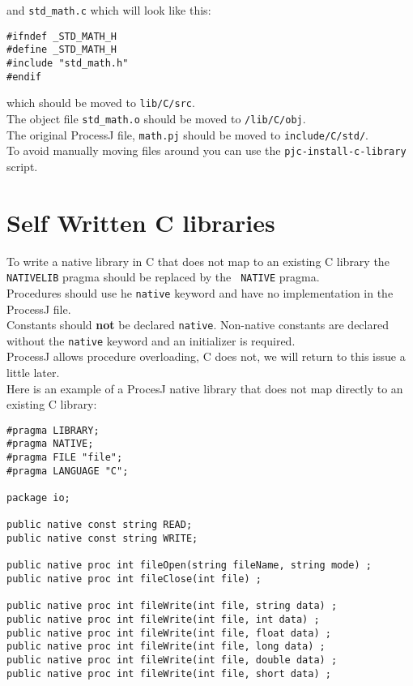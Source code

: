 \documentclass[pdflatex,11pt,letter]{article}
\begin{document}
\noindent
and {\tt std\_math.c} which will look like this:

\begin{verbatim}
#ifndef _STD_MATH_H
#define _STD_MATH_H
#include "std_math.h"
#endif
\end{verbatim}

\noindent
which should be moved to {\tt lib/C/src}.\\

\noindent
The object file {\tt std\_math.o} should be moved to {\tt /lib/C/obj}.\\

\noindent
The original ProcessJ file, {\tt math.pj} should be moved to {\tt include/C/std/}.\\

\noindent
To avoid manually moving files around you can use the {\tt pjc-install-c-library} script.

\section{Self Written C libraries}

To write a native library in C that does not map to an existing C
library the {\tt NATIVELIB} pragma should be replaced by the {\tt
  NATIVE} pragma.\\

\noindent
Procedures should use he {\tt native} keyword and have no
implementation in the ProcessJ file.\\

\noindent
Constants should {\bf not} be declared {\tt native}.
Non-native constants are declared without the
{\tt native} keyword and an initializer is required.\\

\noindent
ProcessJ allows procedure overloading, C does not, we will return to
this issue a little later.\\

\noindent
Here is an example of a ProcesJ native library that does not map
directly to an existing C library:

\begin{verbatim}
#pragma LIBRARY;
#pragma NATIVE;
#pragma FILE "file";
#pragma LANGUAGE "C";

package io;

public native const string READ;
public native const string WRITE;

public native proc int fileOpen(string fileName, string mode) ;
public native proc int fileClose(int file) ;

public native proc int fileWrite(int file, string data) ;
public native proc int fileWrite(int file, int data) ;
public native proc int fileWrite(int file, float data) ;
public native proc int fileWrite(int file, long data) ;
public native proc int fileWrite(int file, double data) ;
public native proc int fileWrite(int file, short data) ;
\end{verbatim}
\end{document}

